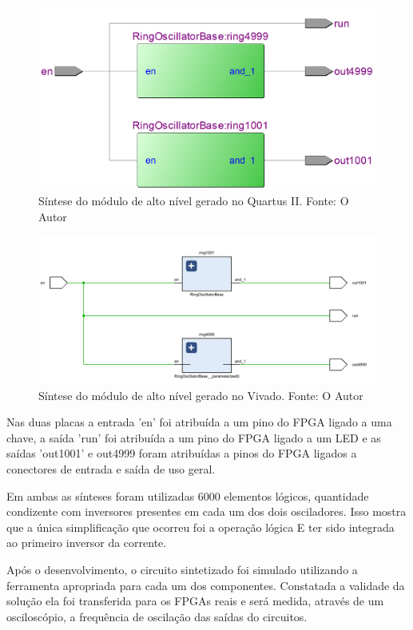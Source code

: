 \begin{figure}[H]
    \centering
    \includegraphics[scale=0.25]{figures/Metodologia/DE2_RTL_Schematic.png}
    \caption{Síntese do módulo de alto nível gerado no Quartus II. Fonte: O Autor}
    \label{fig:DE2RtlSchem}
\end{figure}

\begin{figure}[H]
    \centering
    \includegraphics[width=\linewidth]{figures/Metodologia/ZedBoard_RTL_Schematic.png}
    \caption{Síntese do módulo de alto nível gerado no Vivado. Fonte: O Autor}
    \label{fig:ZedRtlSchem1}
\end{figure}

Nas duas placas a entrada 'en' foi atribuída a um pino do FPGA ligado a uma chave, a saída 'run' foi atribuída a um pino do FPGA ligado a um LED e as saídas 'out1001' e out4999 foram atribuídas a pinos do FPGA ligados a conectores de entrada e saída de uso geral.

Em ambas as sínteses foram utilizadas 6000 elementos lógicos, quantidade condizente com inversores presentes em cada um dos dois osciladores. Isso mostra que a única simplificação que ocorreu foi a operação lógica E ter sido integrada ao primeiro inversor da corrente.

Após o desenvolvimento, o circuito sintetizado foi simulado utilizando a ferramenta apropriada para cada um dos componentes. Constatada a validade da solução ela foi transferida para os FPGAs reais e será medida, através de um osciloscópio, a frequência de oscilação das saídas do circuitos.